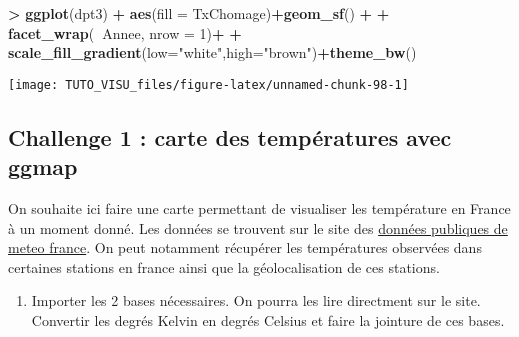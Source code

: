 \documentclass[]{book}
\newenvironment{Shaded}{\begin{snugshade}}{\end{snugshade}}
\newcommand{\DataTypeTok}[1]{\textcolor[rgb]{0.13,0.29,0.53}{#1}}
\newcommand{\DecValTok}[1]{\textcolor[rgb]{0.00,0.00,0.81}{#1}}
\newcommand{\KeywordTok}[1]{\textcolor[rgb]{0.13,0.29,0.53}{\textbf{#1}}}
\newcommand{\NormalTok}[1]{#1}
\newcommand{\OperatorTok}[1]{\textcolor[rgb]{0.81,0.36,0.00}{\textbf{#1}}}
\newcommand{\StringTok}[1]{\textcolor[rgb]{0.31,0.60,0.02}{#1}}
\providecommand{\tightlist}{%
  \setlength{\itemsep}{0pt}\setlength{\parskip}{0pt}}
\theoremstyle{definition}
\theoremstyle{definition}
\theoremstyle{definition}
\theoremstyle{remark}
\begin{document}
\begin{Shaded}
\begin{Highlighting}[]
\OperatorTok{>}\StringTok{ }\KeywordTok{ggplot}\NormalTok{(dpt3) }\OperatorTok{+}\StringTok{ }\KeywordTok{aes}\NormalTok{(}\DataTypeTok{fill =}\NormalTok{ TxChomage)}\OperatorTok{+}\KeywordTok{geom_sf}\NormalTok{() }\OperatorTok{+}
\OperatorTok{+}\StringTok{   }\KeywordTok{facet_wrap}\NormalTok{(}\OperatorTok{~}\NormalTok{Annee, }\DataTypeTok{nrow =} \DecValTok{1}\NormalTok{)}\OperatorTok{+}
\OperatorTok{+}\StringTok{   }\KeywordTok{scale_fill_gradient}\NormalTok{(}\DataTypeTok{low=}\StringTok{"white"}\NormalTok{,}\DataTypeTok{high=}\StringTok{"brown"}\NormalTok{)}\OperatorTok{+}\KeywordTok{theme_bw}\NormalTok{()}
\end{Highlighting}
\end{Shaded}

\begin{center}\texttt{[image: TUTO\_VISU\_files/figure-latex/unnamed-chunk-98-1]} \end{center}

\hypertarget{challenge1}{%
\subsection{Challenge 1 : carte des températures avec ggmap}\label{challenge1}}

On souhaite ici faire une carte permettant de visualiser les température en France à un moment donné. Les données se trouvent sur le site des \href{https://donneespubliques.meteofrance.fr/?fond=produit\&id_produit=90\&id_rubrique=32}{données publiques de meteo france}. On peut notamment récupérer les températures observées dans certaines stations en france ainsi que la géolocalisation de ces stations.

\begin{enumerate}
\def\labelenumi{\arabic{enumi}.}
\tightlist
\item
  Importer les 2 bases nécessaires. On pourra les lire directment sur le site. Convertir les degrés Kelvin en degrés Celsius et faire la jointure de ces bases.
\end{enumerate}
\end{document}
